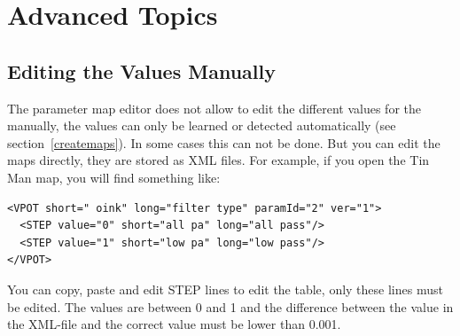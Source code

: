 \section{Advanced Topics} 

\subsection{Editing the \vpot Values Manually}

The parameter map editor does not allow to edit the different values
for the \vpot manually, the values can only be learned or detected
automatically (see section~\ref{createmaps}). In some cases
this can not be done. But you can edit the maps directly, they are
stored as XML files. For example, if you open the Tin Man map, you
will find something like:
 
\begin{verbatim} 
<VPOT short=" oink" long="filter type" paramId="2" ver="1">
  <STEP value="0" short="all pa" long="all pass"/>
  <STEP value="1" short="low pa" long="low pass"/>
</VPOT>
\end{verbatim} 
 
You can copy, paste and edit STEP lines to edit the table, only these
lines must be edited. The values are between 0 and 1 and the
difference between the value in the XML-file and the correct value
must be lower than 0.001.

